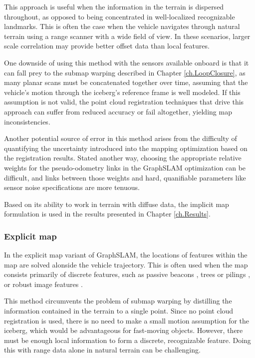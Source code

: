 This approach is useful when the information in the terrain is dispersed throughout, as opposed to being concentrated in well-localized recognizable landmarks. This is often the case when the vehicle navigates through natural terrain using a range scanner with a wide field of view. In these scenarios, larger scale correlation may provide better offset data than local features. 

One downside of using this method with the sensors available onboard is that it can fall prey to the submap warping described in Chapter \ref{ch.LoopClosure}, as many planar scans must be concatenated together over time, assuming that the vehicle's motion through the iceberg's reference frame is well modeled. If this assumption is not valid, the point cloud registration techniques that drive this approach can suffer from reduced accuracy or fail altogether, yielding map inconsistencies. 

Another potential source of error in this method arises from the difficulty of quantifying the uncertainty introduced into the mapping optimization based on the registration results. Stated another way, choosing the appropriate relative weights for the pseudo-odometry links in the GraphSLAM optimization can be difficult, and links between those weights and hard, quanifiable parameters like sensor noise specifications are more tenuous.  

Based on its ability to work in terrain with diffuse data, the implicit map formulation is used in the results presented in Chapter \ref{ch.Results}.


\subsubsection{Explicit map} 

In the explicit map variant of GraphSLAM, the locations of features within the map are solved alonside the vehicle trajectory. This is often used when the map consists primarily of discrete features, such as passive beacons \cite{?}, trees or pilings \cite{Langellaan}, or robust image features \cite{Augenstein}.

This method circumvents the problem of submap warping by distilling the information contained in the terrain to a single point. Since no point cloud registration is used, there is no need to make a small motion assumption for the iceberg, which  would be advantageous for fast-moving objects. However, there must be enough local information to form a discrete, recognizable feature. Doing this with range data alone in natural terrain can be challenging. 

